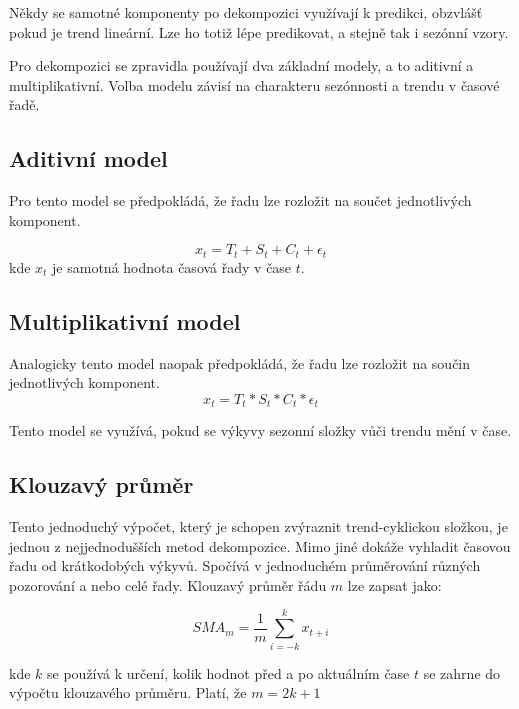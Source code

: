 \documentclass[FM,BP,fonts]{tulthesis}
\begin{document}
Někdy se samotné komponenty po dekompozici využívají k predikci, obzvlášť pokud je trend lineární. Lze ho totiž lépe predikovat, a stejně tak i sezónní vzory. \cite{Hyndman2013-wm}

Pro dekompozici se zpravidla používají dva základní modely, a to aditivní a multiplikativní. Volba modelu závisí na charakteru sezónnosti a trendu v časové řadě.

\subsection{Aditivní model}
Pro tento model se předpokládá, že řadu lze rozložit na součet jednotlivých komponent.

\begin{equation}
	x_t = T_t + S_t + C_t + \epsilon_t
\end{equation}
kde $x_t$ je samotná hodnota časová řady v čase $t$.


\subsection{Multiplikativní model}
Analogicky tento model naopak předpokládá, že řadu lze rozložit na součin jednotlivých komponent.
\begin{equation}
	x_t = T_t * S_t * C_t * \epsilon_t
\end{equation}

Tento model se využívá, pokud se výkyvy sezonní složky vůči trendu mění v čase.

 
\subsection{Klouzavý průměr}
Tento jednoduchý výpočet, který je schopen zvýraznit trend-cyklickou složkou, je jednou z nejjednodušších metod dekompozice. Mimo jiné dokáže vyhladit časovou řadu od krátkodobých výkyvů. Spočívá v jednoduchém průměrování různých pozorování a nebo celé řady.  Klouzavý průměr řádu $m$ lze zapsat jako:
 
\begin{equation}
SMA_m = \frac{1}{m} \sum_{i=-k}^{k}x_{t+i}
\end{equation}
 
kde $k$ se používá k určení, kolik hodnot před a po aktuálním čase $t$ se zahrne do výpočtu klouzavého průměru. Platí, že $m = 2k+1$
\end{document}
